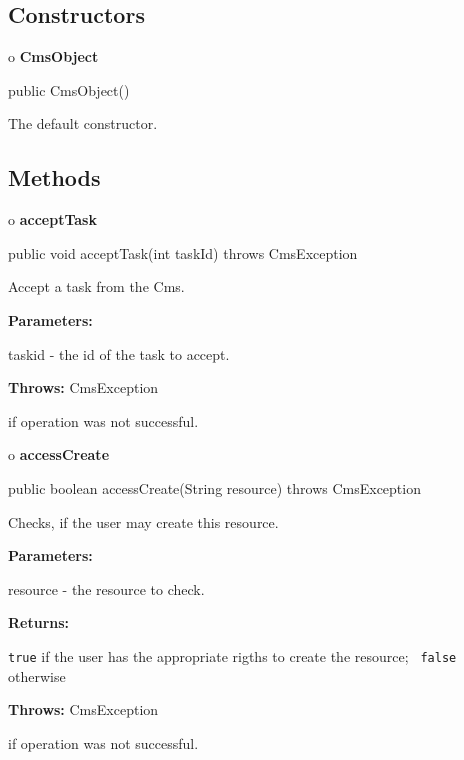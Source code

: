\subsection*{  Constructors }

o {\bf CmsObject}

\begin{PRE}
 public CmsObject()
\end{PRE}

\begin{description}
\htmlDD The default constructor.

\end{description}

\subsection*{  Methods }

o {\bf acceptTask}

\begin{PRE}
 public void acceptTask(int taskId) throws CmsException
\end{PRE}

\begin{description}
\htmlDD Accept a task from the Cms.

\begin{description}
\item {\bf Parameters:}

taskid - the id of the task to accept.
\item {\bf Throws:} CmsException

if operation was not successful.
\end{description}

\end{description}

o {\bf accessCreate}

\begin{PRE}
 public boolean accessCreate(String resource) throws CmsException
\end{PRE}

\begin{description}
\htmlDD Checks, if the user may create this resource.

\begin{description}
\item {\bf Parameters:}

resource - the resource to check.
\item {\bf Returns:}

{\tt true} if the user has the appropriate rigths to create the resource; {\tt
false} otherwise
\item {\bf Throws:} CmsException

if operation was not successful.
\end{description}

\end{description}

